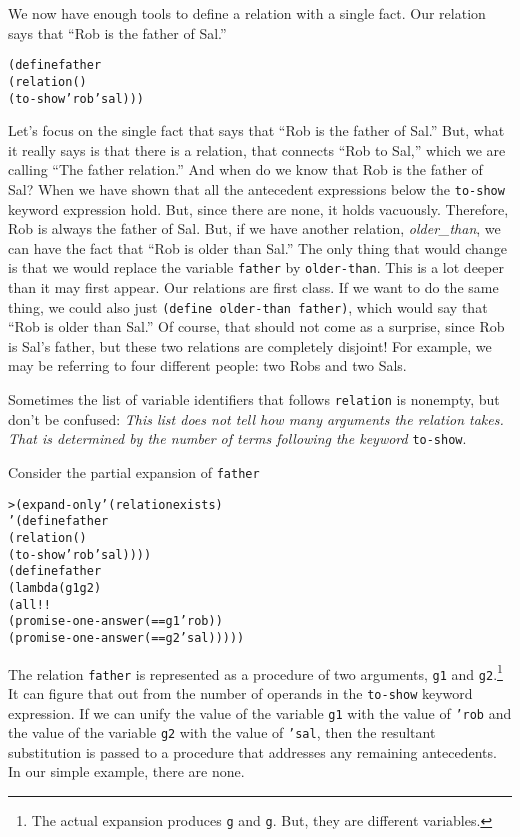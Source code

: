 We now have enough tools to define a relation with a single fact.
Our relation says that ``Rob is the father of Sal.''

\begin{alltt}
(define father
  (relation ()
    (to-show 'rob 'sal)))
\end{alltt}

Let's focus on the single fact that says that ``Rob is the father of
Sal.''  But, what it really says is that there is a relation, that
connects ``Rob to Sal,'' which we are calling ``The father relation.''
And when do we know that Rob is the father of Sal?  When we have shown
that all the antecedent expressions below the \texttt{to-show} keyword
expression hold.  But, since there are none, it holds vacuously.
Therefore, Rob is always the father of Sal.  But, if we have another
relation, \emph{older\_than}, we can have the fact that ``Rob is older
than Sal.''  The only thing that would change is that we would replace
the variable \texttt{father} by \texttt{older-than}.  This is a lot
deeper than it may first appear.  Our relations are first class.  If
we want to do the same thing, we could also just \texttt{(define
older-than father)}, which would say that ``Rob is older than Sal.''
Of course, that should not come as a surprise, since Rob is Sal's
father, but these two relations are completely disjoint!  For example,
we may be referring to four different people: two Robs and two Sals.

Sometimes the list of variable identifiers that follows
\texttt{relation} is nonempty, but don't be confused: \emph{This list
does not tell how many arguments the relation takes. That is
determined by the number of terms following the keyword}
\texttt{to-show}.

Consider the partial expansion of \texttt{father}
\begin{alltt}
> (expand-only '(relation exists)
    '(define father
       (relation ()
         (to-show 'rob 'sal))))
(define father
  (lambda (g1 g2)
    (all!!
      (promise-one-answer (== g1 'rob))
      (promise-one-answer (== g2 'sal)))))
\end{alltt}

The relation \texttt{father} is represented as a procedure of two
arguments, \texttt{g1} and \texttt{g2}.\footnote{The actual expansion
produces \texttt{g} and \texttt{g}.  But, they are different
variables.} It can figure that out from the number of operands in the
\texttt{to-show} keyword expression.  If we can unify the value of the
variable \texttt{g1} with the value of \texttt{'rob} and the value of
the variable \texttt{g2} with the value of \texttt{'sal}, then the
resultant substitution is passed to a procedure that addresses any
remaining antecedents.  In our simple example, there are none.


